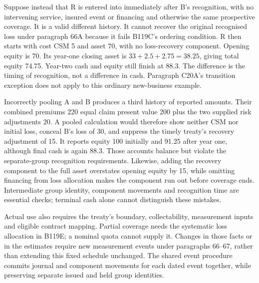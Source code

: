 Suppose instead that R is entered into immediately after B's recognition,
with no intervening service, insured event or financing and otherwise the
same prospective coverage. It is a valid different history. It cannot
recover the original recognised loss under paragraph 66A because it fails
B119C's ordering condition. R then starts with cost CSM 5 and asset 70,
with no loss-recovery component. Opening equity is 70. Its year-one closing
asset is \(33+2.5+2.75=38.25\), giving total equity 74.75. Year-two cash
and equity still finish at 88.3. The difference is the timing of recognition,
not a difference in cash. Paragraph C20A’s transition exception does not apply to this ordinary
new-business example.

Incorrectly pooling A and B produces a third history of reported amounts.
Their combined premiums 220 equal claim present value 200 plus the two
supplied risk adjustments 20. A pooled calculation would therefore show
neither CSM nor initial loss, conceal B's loss of 30, and suppress the timely
treaty's recovery adjustment of 15. It reports equity 100 initially and
91.25 after year one, although final cash is again 88.3. Those accounts
balance but violate the separate-group recognition requirements. Likewise,
adding the recovery component to the full asset overstates opening equity
by 15, while omitting financing from loss allocation makes the component
run out before coverage ends. Intermediate group identity, component
movements and recognition time are essential checks; terminal cash alone
cannot distinguish these mistakes.

Actual use also requires the treaty's boundary, collectability, measurement
inputs and eligible contract mapping. Partial coverage needs the systematic
loss allocation in B119E; a nominal quota cannot supply it. Changes in those
facts or in the estimates require new measurement events under paragraphs
66--67, rather than extending this fixed schedule unchanged. The shared
event procedure commits journal and component movements for each dated
event together, while preserving separate issued and held group identities.
\citep[paragraphs 24, 63--67, 78--86 and B119C--B119F]{aasb17}

